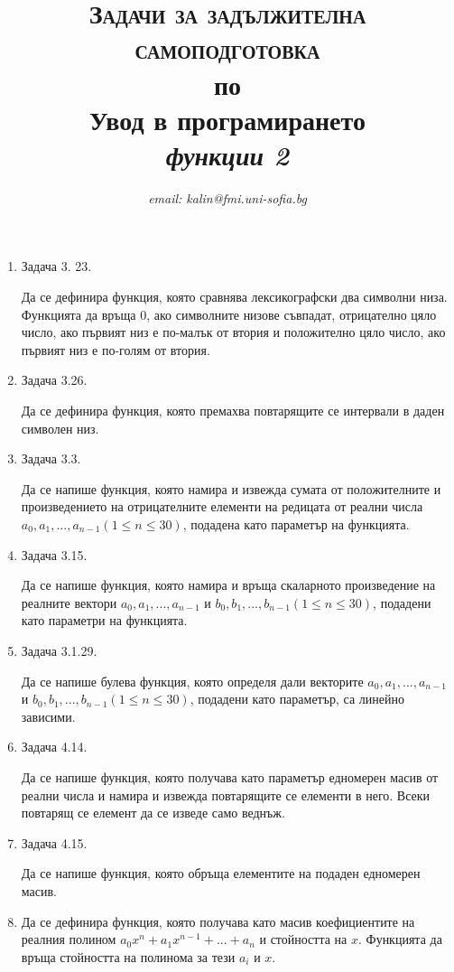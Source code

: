 \documentclass[12pt,a4paper]{article}
\author{\textit{email: kalin@fmi.uni-sofia.bg}}
\title{\textsc{Задачи за задължителна самоподготовка} \\
по \\
Увод в програмирането\\
\textit{функции 2}}
\begin{document}
\maketitle


\begin{enumerate}
	
	\item Задача 3. 23. 

	Да се дефинира функция, която сравнява лексикографски два символни низа. Функцията да връща 0, ако символните низове съвпадат, отрицателно цяло число, ако първият низ е по-малък от втория и положително цяло число, ако първият низ е по-голям от втория.

	\item Задача 3.26. 


	Да се дефинира функция, която премахва повтарящите се интервали в даден символен низ.


	 \item Задача 3.3. 

	 Да се напише функция, която намира и извежда сумата от положителните и произведението на отрицателните елементи на редицата от реални числа $a_0, a_1, ..., a_{n-1} (1 \le n \le 30)$, подадена като параметър на функцията.

	 \item Задача 3.15. 

	 Да се напише функция, която намира и връща скаларното произведение на реалните вектори $a_0, a_1, ..., a_{n-1}$ и $b_0, b_1, ..., b_{n-1} (1 \le n \le 30)$, подадени като параметри на функцията.

	 \item Задача 3.1.29.  

	 Да се напише булева функция, която определя дали векторите $a_0, a_1, ..., a_{n-1}$ и $b_0, b_1, ..., b_{n-1} (1 \le n \le 30)$, подадени като параметър, са линейно зависими.

	 \item Задача 4.14. 

	 Да се напише функция, която получава като параметър едномерен масив от реални числа и намира и извежда повтарящите се елементи в него. Всеки повтарящ се елемент да се изведе само веднъж. 

	 \item Задача 4.15. 

	 Да се напише функция, която обръща елементите на подаден едномерен масив. 

	 \item Да се дефинира функция, която получава като масив коефициентите на реалния полином $a_0x^n + a_1x^{n-1} + ... + a_n$ и стойността на $x$. Функцията да връща стойността на полинома за тези $a_i$ и $x$.



\end{enumerate}
\end{document}
